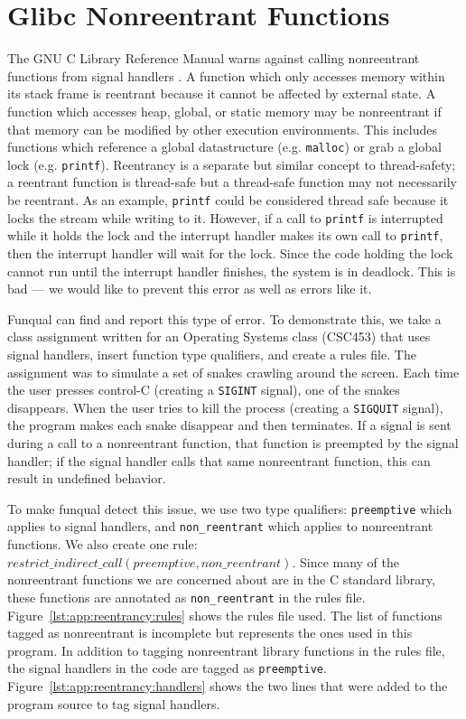 \section{Glibc Nonreentrant Functions}\label{sec:app:reentrancy}


The GNU C Library Reference Manual warns against calling nonreentrant functions from signal handlers \cite{gnu-manual}.  A function which only accesses memory within its stack frame is reentrant because it cannot be affected by external state.  A function which accesses heap, global, or static memory may be nonreentrant if that memory can be modified by other execution environments.  This includes functions which reference a global datastructure (e.g. \lstinline{malloc}) or grab a global lock (e.g. \lstinline{printf}).  Reentrancy is a separate but similar concept to thread-safety; a reentrant function is thread-safe but a thread-safe function may not necessarily be reentrant.  As an example, \lstinline{printf} could be considered thread safe because it locks the stream while writing to it.  However, if a call to \lstinline{printf} is interrupted while it holds the lock and the interrupt handler makes its own call to \lstinline{printf}, then the interrupt handler will wait for the lock.  Since the code holding the lock cannot run until the interrupt handler finishes, the system is in deadlock.  This is bad --- we would like to prevent this error as well as errors like it.  

Funqual can find and report this type of error.  To demonstrate this, we take a class assignment written for an Operating Systems class (CSC453) that uses signal handlers, insert function type qualifiers, and create a rules file.  The assignment was to simulate a set of snakes crawling around the screen.  Each time the user presses control-C (creating a \lstinline{SIGINT} signal), one of the snakes disappears.  When the user tries to kill the process (creating a \lstinline{SIGQUIT} signal), the program makes each snake disappear and then terminates.  If a signal is sent during a call to a nonreentrant function, that function is preempted by the signal handler; if the signal handler calls that same nonreentrant function, this can result in undefined behavior.  

To make funqual detect this issue, we use two type qualifiers: \lstinline{preemptive} which applies to signal handlers, and \lstinline{non_reentrant} which applies to nonreentrant functions.  We also create one rule: $restrict\_indirect\_call(preemptive, non\_reentrant)$.  Since many of the nonreentrant functions we are concerned about are in the C standard library, these functions are annotated as \lstinline{non_reentrant} in the rules file.  Figure~\ref{lst:app:reentrancy:rules} shows the rules file used.  The list of functions tagged as nonreentrant is incomplete but represents the ones used in this program.  In addition to tagging nonreentrant library functions in the rules file, the signal handlers in the code are tagged as \lstinline{preemptive}.  Figure~\ref{lst:app:reentrancy:handlers} shows the two lines that were added to the program source to tag signal handlers.  

